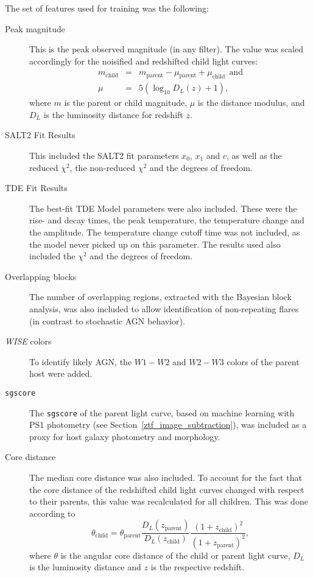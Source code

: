 The set of features used for training was the following:

\begin{description}
  \item[Peak magnitude] This is the peak observed magnitude (in any filter). The value was scaled accordingly for the noisified and redshifted child light curves:
        \begin{subequations}
          \begin{eqnarray}
            m_\text{child} &=& m_\text{parent} - \mu­_\text{parent} + \mu_\text{child}~~\text{and}\\
            \mu &=& 5(\log_{10}D_L(z)+1),
          \end{eqnarray}
        \end{subequations}
        where $m$ is the parent or child magnitude, $\mu$ is the distance modulus, and $D_L$ is the luminosity distance for redshift $z$.
  \item[SALT2 Fit Results] This included the SALT2 fit parameters $x_0$, $x_1$ and $c$, as well as the reduced $\chi^2$, the non-reduced $\chi^2$ and the degrees of freedom.
  \item[TDE Fit Results] The best-fit TDE Model parameters were also included. These were the rise- and decay times, the peak temperature, the temperature change and the amplitude. The temperature change cutoff time was not included, as the model never picked up on this parameter. The results used also included the $\chi^2$ and the degrees of freedom.
  \item[Overlapping blocks] The number of overlapping regions, extracted with the Bayesian block analysis, was also included to allow identification of non-repeating flares (in contrast to stochastic AGN behavior).
  \item[\textit{WISE} colors] To identify likely AGN, the $W1-W2$ and $W2-W3$ colors of the parent host were  added.
  \item[\texttt{sgscore}] The \texttt{sgscore} of the parent light curve, based on machine learning with PS1 photometry (see Section~\ref{ztf_image_subtraction}), was included as a proxy for host galaxy photometry and morphology.
  \item[Core distance] The median core distance was also included. To account for the fact that the core distance of the redshifted child light curves changed with respect to their parents, this value was recalculated for all children. This was done according to
        \begin{equation}
          \theta_\text{child} = \theta_\text{parent} \frac{D_L(z_\text{parent})}{D_L(z_\text{child})} \frac{(1+z_\text{child})^2}{(1+z_\text{parent})^2},
        \end{equation}
        where $\theta$ is the angular core distance of the child or parent light curve, $D_L$ is the luminosity distance and $z$ is the respective redshift.
\end{description}

